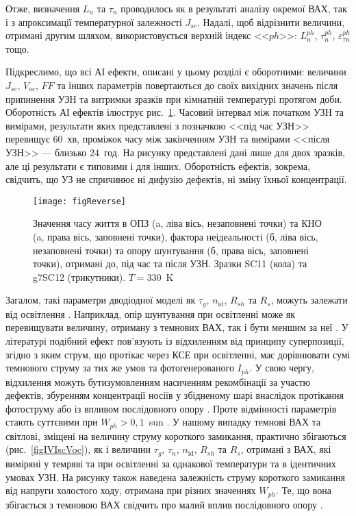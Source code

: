 Отже, визначення $L_n$ та $\tau_n$ проводилось як в результаті аналізу окремої ВАХ, так і з апроксимації
температурної залежності $J_{sc}$.
Надалі, щоб відрізнити величини, отримані другим шляхом, використовується верхній індекс <<$ph$>>: $L_n^{ph}$, $\tau_n^{ph}$, $\varepsilon_{\tau n}^{ph}$ тощо.

Підкреслимо, що всі АІ ефекти, описані у цьому розділі є оборотними:
величини $J_{sc}$, $V_{oc}$, $F\!F$ та інших параметрів повертаються до своїх вихідних значень
після припинення УЗН  та витримки зразків при кімнатній температурі протягом доби.
Оборотність АІ ефектів ілюструє рис.~\ref{figReverse}.
Часовий інтервал між початком УЗН та вимірами, результати яких представлені з позначкою <<під час УЗН>>
перевищує 60~хв, проміжок часу між закінченням УЗН та вимірами <<після УЗН>> --- близько 24~год.
На рисунку представлені дані лише для двох зразків, але ці результати є типовими і для інших.
Оборотність ефектів, зокрема, свідчить, що УЗ не спричинює ні дифузію дефектів,
ні зміну їхньої концентрації.

\begin{figure}
\center
\texttt{[image: figReverse]}%
\caption{\label{figReverse}
Значення часу життя в ОПЗ (a, ліва вісь, незаповнені точки)
та КНО (a, права вісь, заповнені точки),
фактора неідеальності (б, ліва вісь, незаповнені точки) та
 опору шунтування (б, права вісь, заповнені точки),
отримані до, під час та після УЗН.
Зразки SC11 (кола) та g7SC12 (трикутники).
$T=330$~K
}%
\end{figure}

Загалом, такі параметри дводіодної моделі як $\tau_g$, $n_{\mathrm{id}}$, $R_{sh}$ та $R_s$, можуть залежати від освітлення \cite{Iph:KHAN2010,Breitenstein2013,SUGIANTO2009}.
Наприклад,  опір шунтування при освітленні може як перевищувати величину, отриману з темнових ВАХ\cite{Iph:KHAN2010}, так і бути меншим за неї \cite{Breitenstein2013,SUGIANTO2009}.
У літературі \cite{Breitenstein2013} подібний ефект пов'язують із відхиленням від принципу суперпозиції,
згідно з яким струм, що протікає через КСЕ при освітленні, має дорівнювати сумі темнового струму за тих же умов та фотогенерованого $I_{ph}$.
У свою чергу, відхилення можуть бутизумовленням насиченням рекомбінації за участю дефектів,
збуренням концентрації носіїв у збідненому шарі внаслідок протікання фотоструму \cite{Robinson} або із впливом послідовного опору \cite{Rs:BREITENSTEIN2013}.
Проте відмінності параметрів стають суттєвими при $W_{ph}>0,1$~sun
\cite{Breitenstein2013}.
У нашому випадку темнові ВАХ та світлові, зміщені на величину струму короткого замикання, практично збігаються (рис.~\ref{figIVIscVoc}),
як і величини $\tau_g$, $\tau_n$, $n_{\mathrm{id}}$, $R_{sh}$ та $R_s$, отримані з ВАХ, які виміряні у темряві та при освітленні за однакової температури
та в ідентичних умовах УЗН.
На рисунку також наведена залежність струму короткого замикання від напруги холостого ходу, отримана при різних значеннях $W_{ph}$.
Те, що вона збігається з темновою ВАХ свідчить про малий вплив послідовного опору \cite{Robinson}.

